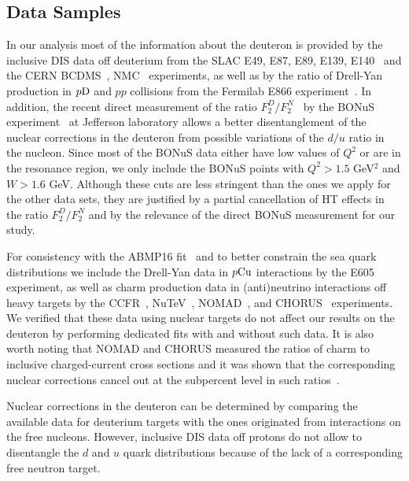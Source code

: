 \documentclass[%
      aps,
      prd,
      floatfix,
      preprintnumbers,
      preprint,
      showpacs,
      nofootinbib,
      tightenlines,
      amssymb,
      amsmath
]{revtex4-1}
\begin{document}
\subsection{Data Samples} 
\label{sec:data} 

In our analysis most of the information about the deuteron is provided by the 
inclusive DIS data off deuterium from the SLAC E49, E87, E89, E139, 
E140~\cite{Bodek:1979rx,Atwood:1976ys,Mestayer:1982ba,Gomez:1993ri,Dasu:1993vk} 
and the CERN BCDMS~\cite{Benvenuti:1989fm}, NMC~\cite{Arneodo:1996qe} 
experiments, as well as by the ratio of Drell-Yan production 
in $p{\rm D}$ and $pp$ collisions from the Fermilab E866 experiment~\cite{Towell:2001nh}.  
In addition, the recent direct measurement of the ratio $F_2^D/F_2^N$~\cite{Griffioen:2015hxa} 
by the BONuS experiment~\cite{Tkachenko:2014byy} 
at Jefferson laboratory allows a better disentanglement of the nuclear corrections in the deuteron 
from possible variations of the $d/u$ ratio in the nucleon. Since most of the BONuS data 
either have low values of $Q^2$ or are in the resonance region, 
we only include the BONuS points with $Q^2>1.5$ GeV$^2$ and $W>1.6$ GeV.  
Although these cuts are less stringent than the ones we apply for the other data sets, they 
are justified by a partial cancellation of HT effects in the ratio $F_2^D/F_2^N$ and  
by the relevance of the direct BONuS measurement for our study. 

For consistency with the ABMP16 fit~\cite{Alekhin:2017kpj} and to better constrain the sea 
quark distributions we include the Drell-Yan data in $p{\rm Cu}$ interactions by the E605 experiment, 
as well as charm production data in (anti)neutrino interactions off heavy targets by the  
CCFR~\cite{Goncharov:2001qe}, NuTeV~\cite{Goncharov:2001qe}, NOMAD~\cite{Samoylov:2013xoa}, 
and CHORUS~\cite{KayisTopaksu:2011mx} experiments. We verified that these data using 
nuclear targets do not affect our results on the deuteron by performing dedicated fits with and without 
such data. It is also worth noting that NOMAD and CHORUS measured the ratios of 
charm to inclusive charged-current cross sections and it was shown that the 
corresponding nuclear corrections cancel out at the subpercent level in such 
ratios~\cite{Alekhin:2014sya}. 

Nuclear corrections in the deuteron can be determined by comparing the available data for deuterium targets 
with the ones originated from interactions on the free nucleons. 
However, inclusive DIS data off protons do not allow to disentangle the $d$ and $u$ quark distributions 
because of the lack of a corresponding free neutron target. 
\end{document}
